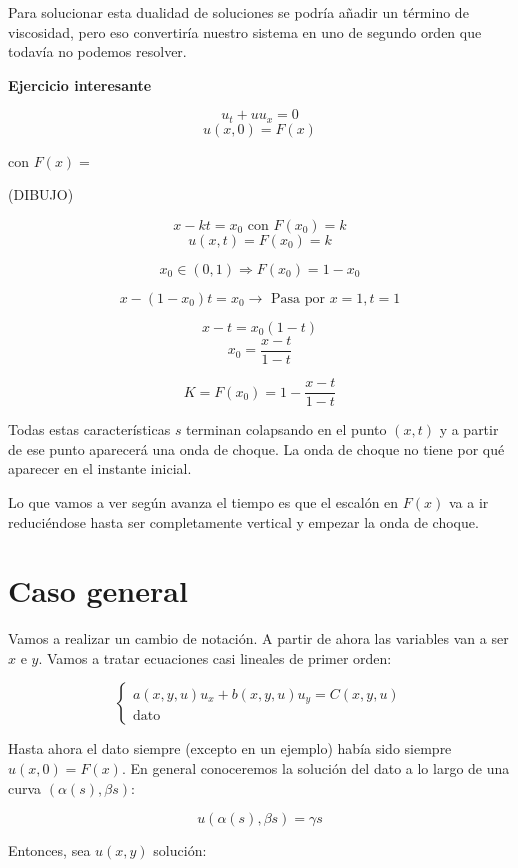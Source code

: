 		Para solucionar esta dualidad de soluciones se podría añadir un término de viscosidad, pero eso convertiría nuestro sistema en uno de segundo orden que todavía no podemos resolver.

		\textbf{Ejercicio interesante}

			$$u_t + uu_x = 0$$
			$$u(x,0) = F(x) $$

			con $F(x) = $

			(DIBUJO)

			$$x - kt = x_0 \text{ con } F(x_0) = k $$
			$$u(x,t) = F(x_0) = k$$

			$$x_0 \in (0,1) \Rightarrow F(x_0) = 1 - x_0 $$

			$$x - (1-x_0) t = x_0 \rightarrow \text{ Pasa por } x = 1, t = 1$$

			$$x-t = x_0 (1-t)$$
			$$x_0 = \frac{x-t}{1-t}$$

			$$K = F(x_0) = 1 - \frac{x-t}{1-t}$$

			Todas estas características $s$ terminan colapsando en el punto $(x,t)$ y a partir de ese punto aparecerá una onda de choque. La onda de choque no tiene por qué aparecer en el instante inicial.

			Lo que vamos a ver según avanza el tiempo es que el escalón en $F(x)$ va a ir reduciéndose hasta ser completamente vertical y empezar la onda de choque.


\section{Caso general}

	Vamos a realizar un cambio de notación. A partir de ahora las variables van a ser $x$ e $y$. Vamos a tratar ecuaciones casi lineales de primer orden:

	\begin{equation*}
		\left\{
			\begin{array}{l}
			a(x,y,u)u_x + b(x,y,u)u_y = C(x,y,u) \\
			\text{dato}
			\end{array}
		\right.
	\end{equation*}

	Hasta ahora el dato siempre (excepto en un ejemplo)%
	había sido siempre $u(x,0) = F(x)$. En general conoceremos la solución del dato a lo largo de una curva $(\alpha(s),\beta{s})$:

	$$ u(\alpha(s),\beta{s}) = \gamma{s} $$

	Entonces, sea $u(x,y)$ solución:

